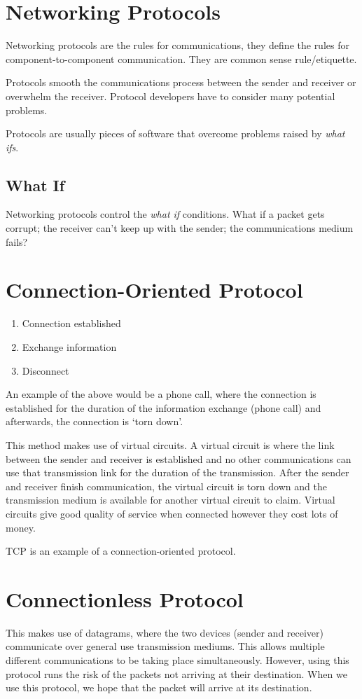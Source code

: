 
\section*{Networking Protocols}
Networking protocols are the rules for communications, they define the rules for component-to-component communication. They are common sense rule/etiquette. 

Protocols smooth the communications process between the sender and receiver or overwhelm the receiver. Protocol developers have to consider many potential problems.

Protocols are usually pieces of software that overcome problems raised by \textit{what ifs}.
\subsection*{What If}
Networking protocols control the \textit{what if} conditions. What if a packet gets corrupt; the receiver can't keep up with the sender; the communications medium fails? 

\section*{Connection-Oriented Protocol}
\begin{enumerate}
    \item Connection established
    \item Exchange information
    \item Disconnect
\end{enumerate}
An example of the above would be a phone call, where the connection is established for the duration of the information exchange (phone call) and afterwards, the connection is `torn down'.

This method makes use of virtual circuits. A virtual circuit is where the link between the sender and receiver is established and no other communications can use that transmission link for the duration of the transmission. After the sender and receiver finish communication, the virtual circuit is torn down and the transmission medium is available for another virtual circuit to claim.
Virtual circuits give good quality of service when connected however they cost lots of money.

TCP is an example of a connection-oriented protocol.

\section*{Connectionless Protocol}
This makes use of datagrams, where the two devices (sender and receiver) communicate over general use transmission mediums. This allows multiple different communications to be taking place simultaneously. However, using this protocol runs the risk of the packets not arriving at their destination. When we use this protocol, we hope that the packet will arrive at its destination.

